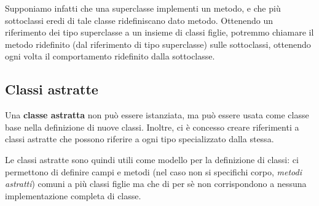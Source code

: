 \documentclass[a4paper,11pt]{article}
\begin{document}
Supponiamo infatti che una superclasse implementi un metodo, e che più sottoclassi eredi di tale classe ridefiniscano dato metodo.
Ottenendo un riferimento dei tipo superclasse a un insieme di classi figlie, potremmo chiamare il metodo ridefinito (dal riferimento di tipo superclasse) sulle sottoclassi, ottenendo ogni volta il comportamento ridefinito dalla sottoclasse.

\subsection{Classi astratte}
Una \textbf{classe astratta} non può essere istanziata, ma può essere usata come classe base nella definizione di nuove classi.
Inoltre, ci è concesso creare riferimenti a classi astratte che possono riferire a ogni tipo specializzato dalla stessa. 

Le classi astratte sono quindi utili come modello per la definizione di classi: ci permettono di definire campi e metodi (nel caso non si specifichi corpo, \textit{metodi astratti}) comuni a più classi figlie ma che di per sè non corrispondono a nessuna implementazione completa di classe.
\end{document}
